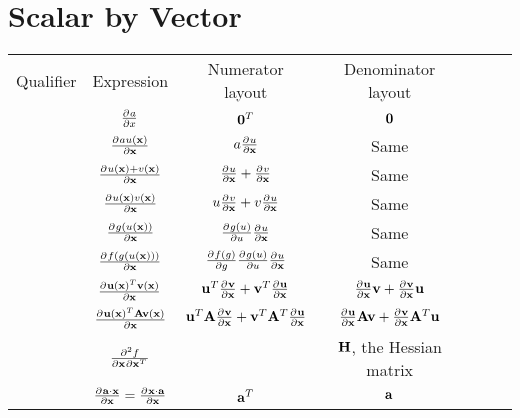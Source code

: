 \section{Scalar by Vector}
\begin{center}
\begin{tabular}{l|Sc|Sc|Sc}
Qualifier                  & Expression                                    & Numerator layout                                   & Denominator layout                            \\
                           & $\pd{a}{x}$                                   & $\vzero^T$                                         & $\vzero$                                      \\
                           & $\pd{au(\vx)}{\vx}$                           & $a\pd{u}{\vx}$                                     & Same                                          \\
                           & $\pd{u(\vx)+v(\vx)}{\vx}$                     & $\pd{u}{\vx} + \pd{v}{\vx}$                        & Same                                          \\
                           & $\pd{u(\vx)v(\vx)}{\vx}$                      & $u\pd{v}{\vx} + v\pd{u}{\vx}$                      & Same                                          \\
                           & $\pd{g(u(\vx))}{\vx}$                         & $\pd{g(u)}{u}\pd{u}{\vx}$                          & Same                                          \\
                           & $\pd{f(g(u(\vx)))}{\vx}$                      & $\pd{f(g)}{g}\pd{g(u)}{u}\pd{u}{\vx}$              & Same                                          \\
                           & $\pd{\vu(\vx)^T\vv(\vx)}{\vx}$                & $\vu^T\pd{\vv}{\vx}+\vv^T\pd{\vu}{\vx}$            & $\pd{\vu}{\vx}\vv+\pd{\vv}{\vx}\vu$           \\
                           & $\pd{\vu(\vx)^T\mA\vv(\vx)}{\vx}$             & $\vu^T\mA\pd{\vv}{\vx}+\vv^T\mA^T\pd{\vu}{\vx}$    & $\pd{\vu}{\vx}\mA\vv+\pd{\vv}{\vx}\mA^T\vu$   \\
                           & $\md{f}{2}{\vx}{}{{\vx^T}}{}$                 &                                                    & $\mH$, the Hessian matrix                     \\
                           & $\pd{\va\cdot\vx}{\vx}=\pd{\vx\cdot\va}{\vx}$ & $\va^T$                                            & $\va$                                         \\

\end{tabular}
\end{center}
